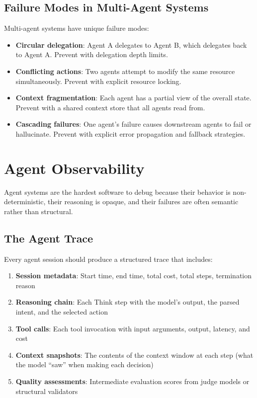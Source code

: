 \subsection{Failure Modes in Multi-Agent Systems}

Multi-agent systems have unique failure modes:

\begin{itemize}[leftmargin=*]
    \item \textbf{Circular delegation}: Agent A delegates to Agent B, which delegates back to Agent A. Prevent with delegation depth limits.
    \item \textbf{Conflicting actions}: Two agents attempt to modify the same resource simultaneously. Prevent with explicit resource locking.
    \item \textbf{Context fragmentation}: Each agent has a partial view of the overall state. Prevent with a shared context store that all agents read from.
    \item \textbf{Cascading failures}: One agent's failure causes downstream agents to fail or hallucinate. Prevent with explicit error propagation and fallback strategies.
\end{itemize}


\section{Agent Observability}

Agent systems are the hardest software to debug because their behavior is non-deterministic, their reasoning is opaque, and their failures are often semantic rather than structural.

\subsection{The Agent Trace}

Every agent session should produce a structured trace that includes:

\begin{enumerate}[leftmargin=*]
    \item \textbf{Session metadata}: Start time, end time, total cost, total steps, termination reason
    \item \textbf{Reasoning chain}: Each Think step with the model's output, the parsed intent, and the selected action
    \item \textbf{Tool calls}: Each tool invocation with input arguments, output, latency, and cost
    \item \textbf{Context snapshots}: The contents of the context window at each step (what the model ``saw'' when making each decision)
    \item \textbf{Quality assessments}: Intermediate evaluation scores from judge models or structural validators
\end{enumerate}


